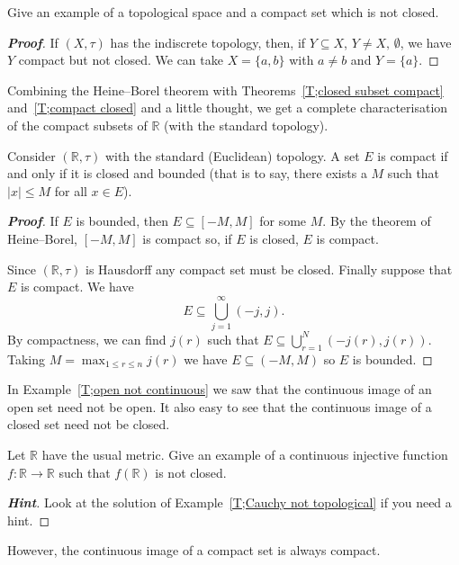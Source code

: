 \begin{theorem}\label{T;compact not closed}
Give an example of a topological space
and a compact set which is not closed.
\end{theorem}
\begin{proof}[\bf Proof] If $(X,\tau)$ has the indiscrete topology,
then, if $Y\subseteq X$, $Y\neq X,\,\emptyset$, we have $Y$
compact but not closed. We can take $X=\{a,b\}$ with $a\neq b$
and $Y=\{a\}$.
\end{proof}


Combining the Heine--Borel theorem with
Theorems~\ref{T;closed subset compact}
and~\ref{T;compact closed} and a little thought,
we get a complete characterisation of the compact subsets
of ${\mathbb R}$ (with the standard topology).

\begin{theorem}\label{T;closed bounded}
Consider $({\mathbb R},\tau)$ with the standard
(Euclidean) topology. A set $E$ is compact if and
only if it is closed and bounded
(that is to say, there exists a
$M$ such that $|x|\leq M$ for all $x\in E$).
\end{theorem}
\begin{proof}[\bf Proof] If $E$ is bounded, then $E\subseteq [-M,M]$
for some $M$. By the theorem of Heine--Borel, $[-M,M]$
is compact so, if $E$ is closed, $E$ is compact.

Since $({\mathbb R},\tau)$ is Hausdorff any compact set must be closed.
Finally suppose that $E$ is compact. We have
\[E\subseteq \bigcup_{j=1}^{\infty}(-j,j).\]
By compactness, we can find $j(r)$ such that $E \subseteq\bigcup_{r=1}^{N}(-j(r),j(r))$. Taking $M=\max_{1\leq r\leq n}j(r)$ we have $E\subseteq(-M,M)$ so
$E$ is bounded.
\end{proof}


In Example~\ref{T;open not continuous} we saw that the
continuous image of an open set need not be open.
It also easy to see that the
continuous image of a closed set need not be closed.
\begin{problem} Let ${\mathbb R}$ have the usual metric.
Give an example of a continuous injective function
$f:{\mathbb R}\rightarrow{\mathbb R}$ such that
$f({\mathbb R})$ is not closed.
\end{problem}
\begin{proof}[\bf Hint] Look at the solution of Example~\ref{T;Cauchy not topological} if you need a hint.
\end{proof}

However, the continuous image of a compact set
is always compact.




